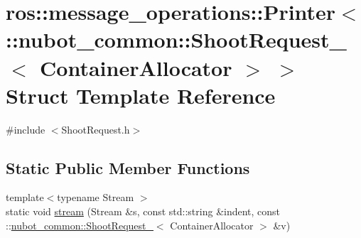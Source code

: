 \hypertarget{structros_1_1message__operations_1_1Printer_3_01_1_1nubot__common_1_1ShootRequest___3_01ContainerAllocator_01_4_01_4}{\section{ros\-:\-:message\-\_\-operations\-:\-:Printer$<$ \-:\-:nubot\-\_\-common\-:\-:Shoot\-Request\-\_\-$<$ Container\-Allocator $>$ $>$ Struct Template Reference}
\label{structros_1_1message__operations_1_1Printer_3_01_1_1nubot__common_1_1ShootRequest___3_01ContainerAllocator_01_4_01_4}
}


{\ttfamily \#include $<$Shoot\-Request.\-h$>$}

\subsection*{Static Public Member Functions}
\begin{DoxyCompactItemize}
\item 
{\footnotesize template$<$typename Stream $>$ }\\static void \hyperlink{structros_1_1message__operations_1_1Printer_3_01_1_1nubot__common_1_1ShootRequest___3_01ContainerAllocator_01_4_01_4_afde5716e91ad9b7de250cb91f06892ee}{stream} (Stream \&s, const std\-::string \&indent, const \-::\hyperlink{structnubot__common_1_1ShootRequest__}{nubot\-\_\-common\-::\-Shoot\-Request\-\_\-}$<$ Container\-Allocator $>$ \&v)
\end{DoxyCompactItemize}


